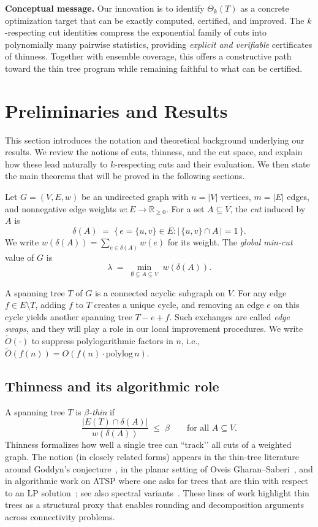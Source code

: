 \documentclass[11pt,letterpaper]{article}
\begin{document}
\medskip
\noindent
\textbf{Conceptual message.}  
Our innovation is to identify $\Theta_k(T)$ as a concrete optimization target
that can be exactly computed, certified, and improved. The $k$-respecting cut
identities compress the exponential family of cuts into polynomially many
pairwise statistics, providing \emph{explicit and verifiable} certificates of
thinness. Together with ensemble coverage, this offers a constructive path
toward the thin tree program while remaining faithful to what can be certified.

\section{Preliminaries and Results}
\label{sec:framework}

This section introduces the notation and theoretical background
underlying our results. We review the notions of cuts, thinness,
and the cut space, and explain how these lead naturally to
$k$-respecting cuts and their evaluation. We then state the
main theorems that will be proved in the following sections.

Let $G=(V,E,w)$ be an undirected graph with $n=|V|$ vertices,
$m=|E|$ edges, and nonnegative edge weights $w:E\to\mathbb{R}_{\ge 0}$.
For a set $A\subseteq V$, the \emph{cut} induced by $A$ is
\[
\delta(A) \;=\; \{\, e=\{u,v\}\in E : |\,\{u,v\}\cap A\,|=1\,\}.
\]
We write $w(\delta(A))=\sum_{e\in\delta(A)}w(e)$ for its weight.
The \emph{global min-cut} value of $G$ is
\[
\lambda \;=\; \min_{\emptyset \subsetneq A \subsetneq V} \; w(\delta(A)).
\]

A spanning tree $T$ of $G$ is a connected acyclic subgraph on $V$.
For any edge $f\in E\setminus T$, adding $f$ to $T$ creates a unique cycle,
and removing an edge $e$ on this cycle yields another spanning tree
$T-e+f$. Such exchanges are called \emph{edge swaps}, and they will play
a role in our local improvement procedures. We write $\tilde{O}(\cdot)$ to suppress
polylogarithmic factors in $n$, i.e., $\tilde{O}(f(n)) = O(f(n)\cdot \mathrm{polylog}\, n)$.

\subsection{Thinness and its algorithmic role}

A spanning tree $T$ is \emph{$\beta$-thin} if
\[
\frac{|E(T)\cap\delta(A)|}{w(\delta(A))} \;\le\; \beta
\qquad \text{for all } A\subseteq V.
\]
Thinness formalizes how well a single tree can “track’’ all cuts of a weighted
graph. The notion (in closely related forms) appears in the thin-tree
literature around Goddyn’s conjecture~\cite{God04}, in the planar setting of
Oveis Gharan–Saberi~\cite{OS11}, and in algorithmic work on ATSP where one asks
for trees that are thin with respect to an LP solution~\cite{asadpour2017}; see
also spectral variants~\cite{anariog2015focs}. These lines of work highlight thin trees
as a structural proxy that enables rounding and decomposition arguments across connectivity problems.
\end{document}
